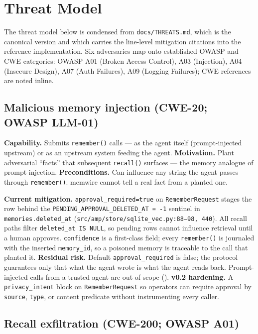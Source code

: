 \documentclass[11pt,letterpaper,twocolumn]{article}
\begin{document}
\section{Threat Model}
\label{sec:threats}

The threat model below is condensed from \texttt{docs/THREATS.md}, which is the canonical version and which carries the line-level mitigation citations into the reference implementation. Six adversaries map onto established OWASP and CWE categories: OWASP A01 (Broken Access Control), A03 (Injection), A04 (Insecure Design), A07 (Auth Failures), A09 (Logging Failures); CWE references are noted inline.

\subsection{Malicious memory injection (CWE-20; OWASP LLM-01)}
\label{sec:threats-injection}

\textbf{Capability.} Submits \texttt{remember()} calls --- as the agent itself (prompt-injected upstream) or as an upstream system feeding the agent. \textbf{Motivation.} Plant adversarial ``facts'' that subsequent \texttt{recall()} surfaces --- the memory analogue of prompt injection. \textbf{Preconditions.} Can influence any string the agent passes through \texttt{remember()}. memwire cannot tell a real fact from a planted one.

\textbf{Current mitigation.} \texttt{approval\_required=true} on \texttt{RememberRequest} stages the row behind the \texttt{PENDING\_APPROVAL\_DELETED\_AT = -1} sentinel in \texttt{memories.deleted\_at} (\texttt{src/amp/store/sqlite\_vec.py:88--98, 440}). All recall paths filter \texttt{deleted\_at IS NULL}, so pending rows cannot influence retrieval until a human approves. \texttt{confidence} is a first-class field; every \texttt{remember()} is journaled with the inserted \texttt{memory\_id}, so a poisoned memory is traceable to the call that planted it. \textbf{Residual risk.} Default \texttt{approval\_required} is false; the protocol guarantees only that what the agent wrote is what the agent reads back. Prompt-injected calls from a trusted agent are out of scope (). \textbf{v0.2 hardening.} A \texttt{privacy\_intent} block on \texttt{RememberRequest} so operators can require approval by \texttt{source}, \texttt{type}, or content predicate without instrumenting every caller.

\subsection{Recall exfiltration (CWE-200; OWASP A01)}
\label{sec:threats-exfiltration}
\end{document}
